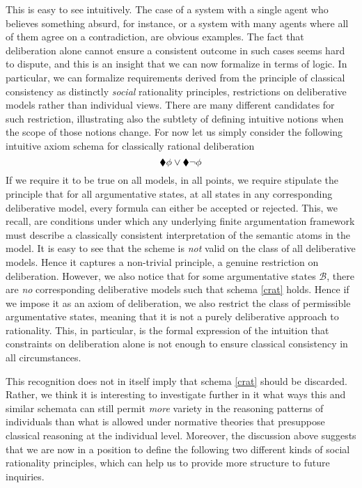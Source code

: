 \documentclass[greybox]{svmult}
\newcommand{\views}{\mathcal B}
\begin{document}
This is easy to see intuitively. The case of a system with a single agent who believes something absurd, for instance, or a system with many agents where all of them agree on a contradiction, are obvious examples. The fact that deliberation alone cannot ensure a consistent outcome in such cases seems hard to dispute, and this is an insight that we can now formalize in terms of logic. In particular, we can formalize requirements derived from the principle of classical consistency as distinctly \emph{social} rationality principles, restrictions on deliberative models rather than individual views. There are many different candidates for such restriction, illustrating also the subtlety of defining intuitive notions when the scope of those notions change. For now let us simply consider the following intuitive axiom schema for classically rational deliberation
\begin{equation}\label{crat}
\cdia \phi \lor \cdia \neg \phi
\end{equation}
If we require it to be true on all models, in all points, we require stipulate the principle that for all argumentative states, at all states in any corresponding deliberative model, every formula can either be accepted or rejected. This, we recall, are conditions under which any underlying finite argumentation framework must describe a classically consistent interpretation of the semantic atoms in the model. It is easy to see that the scheme is \emph{not} valid on the class of all deliberative models. Hence it captures a non-trivial principle, a genuine restriction on deliberation. However, we also notice that for some argumentative states $\views$, there are \emph{no} corresponding deliberative models such that schema \ref{crat} holds.    
Hence if we impose it as an axiom of deliberation, we also restrict the class of permissible argumentative states, meaning that it is not a purely deliberative approach to rationality. This, in particular, is the formal expression of the intuition that constraints on deliberation alone is not enough to ensure classical consistency in all circumstances.

This recognition does not in itself imply that schema \ref{crat} should be discarded. Rather, we think it is interesting to investigate further in it what ways this and similar schemata can still permit \emph{more} variety in the reasoning patterns of individuals than what is allowed under normative theories that presuppose classical reasoning at the individual level. Moreover, the discussion above suggests that we are now in a position to define the following two different kinds of social rationality principles, which can help us to provide more structure to future inquiries.
\end{document}

